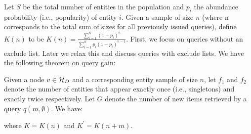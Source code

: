 Let $S$ be the total number of entities in the population and $p_i$ the abundance probability (i.e., popularity) of entity $i$. Given a sample of size $n$ (where n corresponds to the total sum of sizes for all previously issued queries), define $K(n)$ to be $K(n) = \frac{\sum_{i=1}^S (1-p_i)^n}{\sum_{i=1}^S p_i(1-p_i)^{n-1}}$. First, we focus on queries without an exclude list. Later we relax this and discuss queries with exclude lists. We have the following theorem on query gain:

\begin{theorem}
\label{newgain}
Given a node $v \in \mathcal{H}_D$ and a corresponding entity sample of size $n$, let $f_1$ and $f_2$ denote the number of entities that appear exactly once (i.e., singletons) and exactly twice respectively. Let $G$ denote the number of new items retrieved by a query $q(m,\emptyset)$. We have:

where $K = K(n)$ and $K^{\prime} = K(n+m)$.
\end{theorem}
\iftr
